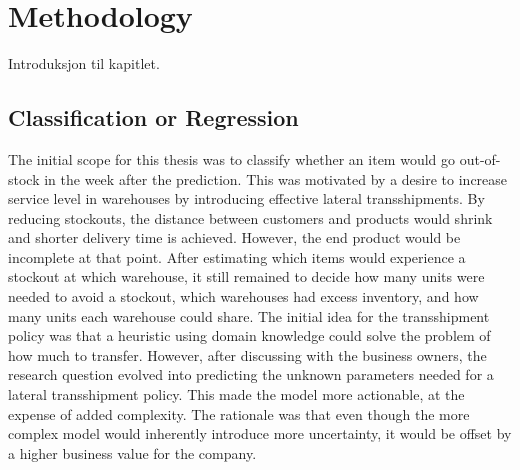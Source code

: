 \documentclass[../../main.tex]{subfiles}
\begin{document}

\chapter{Methodology}

Introduksjon til kapitlet.

\section{Classification or Regression}
The initial scope for this thesis was to classify whether an item would go out-of-stock in the week after the prediction. This was motivated by a desire to increase service level in warehouses by introducing effective lateral transshipments. By reducing stockouts, the distance between customers and products would shrink and shorter delivery time is achieved. However, the end product would be incomplete at that point. After estimating which items would experience a stockout at which warehouse, it still remained to decide how many units were needed to avoid a stockout, which warehouses had excess inventory, and how many units each warehouse could share. The initial idea for the transshipment policy was that a heuristic using domain knowledge could solve the problem of how much to transfer. However, after discussing with the business owners, the research question evolved into predicting the unknown parameters needed for a lateral transshipment policy. This made the model more actionable, at the expense of added complexity. The rationale was that even though the more complex model would inherently introduce more uncertainty, it would be offset by a higher business value for the company.

\end{document}
